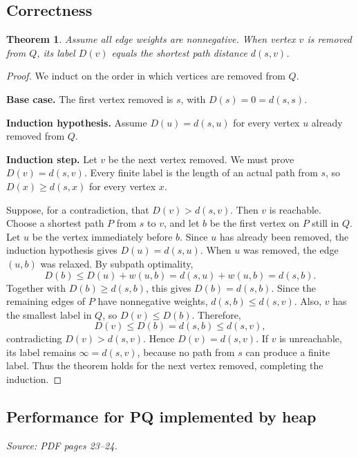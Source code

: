 \documentclass[11pt,letterpaper]{article}
\newtheorem{theorem}{Theorem}
\newcommand{\sourcepages}[1]{\textit{Source: PDF pages #1.}}
\begin{document}
\subsection{Correctness}
\begin{theorem}
    Assume all edge weights are nonnegative. When vertex $v$ is removed from $Q$, its label $D(v)$ equals the shortest path distance $d(s,v)$.
\end{theorem}
\begin{proof}
    We induct on the order in which vertices are removed from $Q$.

    \textbf{Base case.} The first vertex removed is $s$, with
    $D(s) = 0 = d(s,s)$.

    \textbf{Induction hypothesis.} Assume $D(u) = d(s,u)$ for every vertex $u$ already removed from $Q$.

    \textbf{Induction step.} Let $v$ be the next vertex removed. We must prove $D(v) = d(s,v)$.
    Every finite label is the length of an actual path from $s$, so
    $D(x) \geq d(s,x)$ for every vertex $x$.

    Suppose, for a contradiction, that $D(v) > d(s,v)$. Then $v$ is reachable.
    Choose a shortest path $P$ from $s$ to $v$, and let $b$ be the first vertex on $P$ still in $Q$.
    Let $u$ be the vertex immediately before $b$. Since $u$ has already been removed, the induction hypothesis gives $D(u) = d(s,u)$.
    When $u$ was removed, the edge $(u,b)$ was relaxed. By subpath optimality,
    \[
        D(b) \leq D(u) + w(u,b)
        = d(s,u) + w(u,b)
        = d(s,b).
    \]
    Together with $D(b) \geq d(s,b)$, this gives $D(b) = d(s,b)$.
    Since the remaining edges of $P$ have nonnegative weights,
    $d(s,b) \leq d(s,v)$. Also, $v$ has the smallest label in $Q$, so $D(v) \leq D(b)$.
    Therefore,
    \[
        D(v) \leq D(b) = d(s,b) \leq d(s,v),
    \]
    contradicting $D(v) > d(s,v)$. Hence $D(v) = d(s,v)$.
    If $v$ is unreachable, its label remains $\infty = d(s,v)$, because no path from $s$ can produce a finite label.
    Thus the theorem holds for the next vertex removed, completing the induction.
\end{proof}

\subsection{Performance for PQ implemented by heap}
\sourcepages{23--24}
\end{document}
